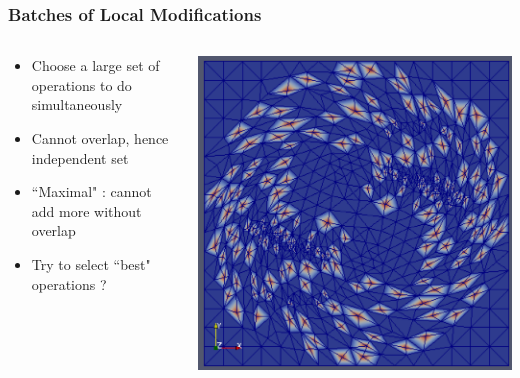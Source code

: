 \documentclass{beamer}
\begin{document}
\begin{frame}
\frametitle{Batches of Local Modifications}
\begin{columns}[T]
\begin{column}{.5\textwidth}
\begin{itemize}
\item Choose a large set of operations to do simultaneously
\item Cannot overlap, hence independent set
\item ``Maximal" : cannot add more without overlap
\item Try to select ``best" operations ?
\end{itemize}
\end{column}
\begin{column}{.5\textwidth}
\includegraphics[width=\textwidth]{coarsen_indset.png}
\end{column}
\end{columns}
\end{frame}
\end{document}
